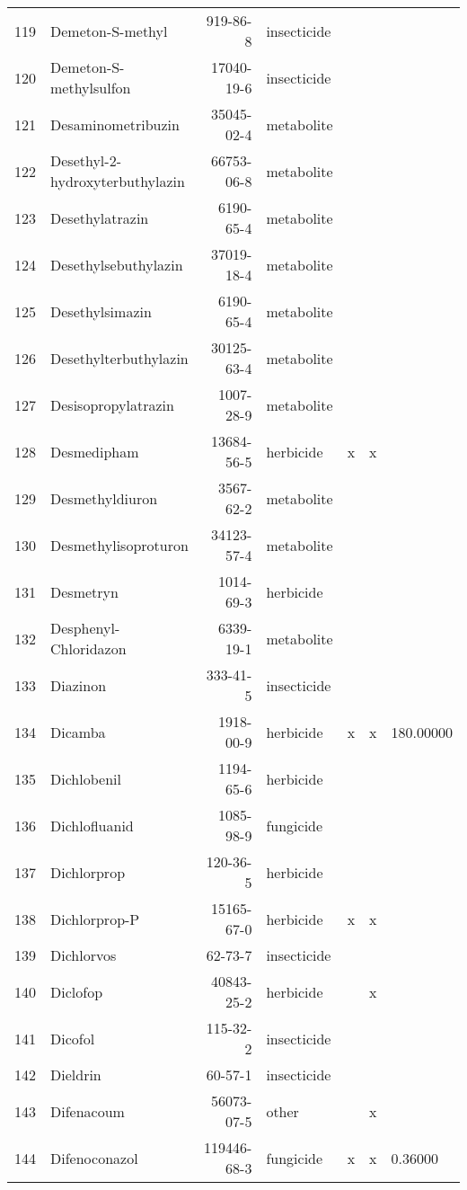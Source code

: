 \begin{longtable}{lp{3cm}rlp{1cm}p{1cm}p{1.5cm}}
  119 & Demeton-S-methyl & 919-86-8 & insecticide &  &  &  \\ 
  120 & Demeton-S-methylsulfon & 17040-19-6 & insecticide &  &  &  \\ 
  121 & Desaminometribuzin & 35045-02-4 & metabolite &  &  &  \\ 
  122 & Desethyl-2-hydroxyterbuthylazin & 66753-06-8 & metabolite &  &  &  \\ 
  123 & Desethylatrazin & 6190-65-4 & metabolite &  &  &  \\ 
  124 & Desethylsebuthylazin & 37019-18-4 & metabolite &  &  &  \\ 
  125 & Desethylsimazin & 6190-65-4 & metabolite &  &  &  \\ 
  126 & Desethylterbuthylazin & 30125-63-4 & metabolite &  &  &  \\ 
  127 & Desisopropylatrazin & 1007-28-9 & metabolite &  &  &  \\ 
  128 & Desmedipham & 13684-56-5 & herbicide & x & x &  \\ 
  129 & Desmethyldiuron & 3567-62-2 & metabolite &  &  &  \\ 
  130 & Desmethylisoproturon & 34123-57-4 & metabolite &  &  &  \\ 
  131 & Desmetryn & 1014-69-3 & herbicide &  &  &  \\ 
  132 & Desphenyl-Chloridazon & 6339-19-1 & metabolite &  &  &  \\ 
  133 & Diazinon & 333-41-5 & insecticide &  &  &  \\ 
  134 & Dicamba & 1918-00-9 & herbicide & x & x & 180.00000 \\ 
  135 & Dichlobenil & 1194-65-6 & herbicide &  &  &  \\ 
  136 & Dichlofluanid & 1085-98-9 & fungicide &  &  &  \\ 
  137 & Dichlorprop & 120-36-5 & herbicide &  &  &  \\ 
  138 & Dichlorprop-P & 15165-67-0 & herbicide & x & x &  \\ 
  139 & Dichlorvos & 62-73-7 & insecticide &  &  &  \\ 
  140 & Diclofop & 40843-25-2 & herbicide &  & x &  \\ 
  141 & Dicofol & 115-32-2 & insecticide &  &  &  \\ 
  142 & Dieldrin & 60-57-1 & insecticide &  &  &  \\ 
  143 & Difenacoum & 56073-07-5 & other &  & x &  \\ 
  144 & Difenoconazol & 119446-68-3 & fungicide & x & x & 0.36000 \\ 

\end{longtable}
